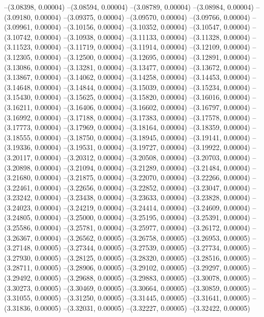 --(3.08398, 0.00004)
--(3.08594, 0.00004)
--(3.08789, 0.00004)
--(3.08984, 0.00004)
--(3.09180, 0.00004)
--(3.09375, 0.00004)
--(3.09570, 0.00004)
--(3.09766, 0.00004)
--(3.09961, 0.00004)
--(3.10156, 0.00004)
--(3.10352, 0.00004)
--(3.10547, 0.00004)
--(3.10742, 0.00004)
--(3.10938, 0.00004)
--(3.11133, 0.00004)
--(3.11328, 0.00004)
--(3.11523, 0.00004)
--(3.11719, 0.00004)
--(3.11914, 0.00004)
--(3.12109, 0.00004)
--(3.12305, 0.00004)
--(3.12500, 0.00004)
--(3.12695, 0.00004)
--(3.12891, 0.00004)
--(3.13086, 0.00004)
--(3.13281, 0.00004)
--(3.13477, 0.00004)
--(3.13672, 0.00004)
--(3.13867, 0.00004)
--(3.14062, 0.00004)
--(3.14258, 0.00004)
--(3.14453, 0.00004)
--(3.14648, 0.00004)
--(3.14844, 0.00004)
--(3.15039, 0.00004)
--(3.15234, 0.00004)
--(3.15430, 0.00004)
--(3.15625, 0.00004)
--(3.15820, 0.00004)
--(3.16016, 0.00004)
--(3.16211, 0.00004)
--(3.16406, 0.00004)
--(3.16602, 0.00004)
--(3.16797, 0.00004)
--(3.16992, 0.00004)
--(3.17188, 0.00004)
--(3.17383, 0.00004)
--(3.17578, 0.00004)
--(3.17773, 0.00004)
--(3.17969, 0.00004)
--(3.18164, 0.00004)
--(3.18359, 0.00004)
--(3.18555, 0.00004)
--(3.18750, 0.00004)
--(3.18945, 0.00004)
--(3.19141, 0.00004)
--(3.19336, 0.00004)
--(3.19531, 0.00004)
--(3.19727, 0.00004)
--(3.19922, 0.00004)
--(3.20117, 0.00004)
--(3.20312, 0.00004)
--(3.20508, 0.00004)
--(3.20703, 0.00004)
--(3.20898, 0.00004)
--(3.21094, 0.00004)
--(3.21289, 0.00004)
--(3.21484, 0.00004)
--(3.21680, 0.00004)
--(3.21875, 0.00004)
--(3.22070, 0.00004)
--(3.22266, 0.00004)
--(3.22461, 0.00004)
--(3.22656, 0.00004)
--(3.22852, 0.00004)
--(3.23047, 0.00004)
--(3.23242, 0.00004)
--(3.23438, 0.00004)
--(3.23633, 0.00004)
--(3.23828, 0.00004)
--(3.24023, 0.00004)
--(3.24219, 0.00004)
--(3.24414, 0.00004)
--(3.24609, 0.00004)
--(3.24805, 0.00004)
--(3.25000, 0.00004)
--(3.25195, 0.00004)
--(3.25391, 0.00004)
--(3.25586, 0.00004)
--(3.25781, 0.00004)
--(3.25977, 0.00004)
--(3.26172, 0.00004)
--(3.26367, 0.00004)
--(3.26562, 0.00005)
--(3.26758, 0.00005)
--(3.26953, 0.00005)
--(3.27148, 0.00005)
--(3.27344, 0.00005)
--(3.27539, 0.00005)
--(3.27734, 0.00005)
--(3.27930, 0.00005)
--(3.28125, 0.00005)
--(3.28320, 0.00005)
--(3.28516, 0.00005)
--(3.28711, 0.00005)
--(3.28906, 0.00005)
--(3.29102, 0.00005)
--(3.29297, 0.00005)
--(3.29492, 0.00005)
--(3.29688, 0.00005)
--(3.29883, 0.00005)
--(3.30078, 0.00005)
--(3.30273, 0.00005)
--(3.30469, 0.00005)
--(3.30664, 0.00005)
--(3.30859, 0.00005)
--(3.31055, 0.00005)
--(3.31250, 0.00005)
--(3.31445, 0.00005)
--(3.31641, 0.00005)
--(3.31836, 0.00005)
--(3.32031, 0.00005)
--(3.32227, 0.00005)
--(3.32422, 0.00005)
